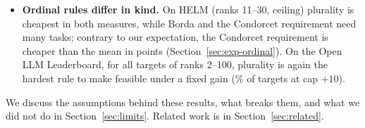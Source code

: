 \begin{itemize}
\item \textbf{Ordinal rules differ in kind.} On HELM (ranks 11--30, ceiling) plurality is cheapest in both measures, while Borda and the Condorcet requirement need many tasks; contrary to our expectation, the Condorcet requirement is cheaper than the mean in points (Section~\ref{sec:exp-ordinal}). On the Open LLM Leaderboard, for all targets of ranks 2--100, plurality is again the hardest rule to make feasible under a fixed gain (\ordHundredTenPluralityFeas\% of targets at cap $+10$).
\end{itemize}
We discuss the assumptions behind these results, what breaks them, and what we did not do in Section~\ref{sec:limits}. Related work is in Section~\ref{sec:related}.
